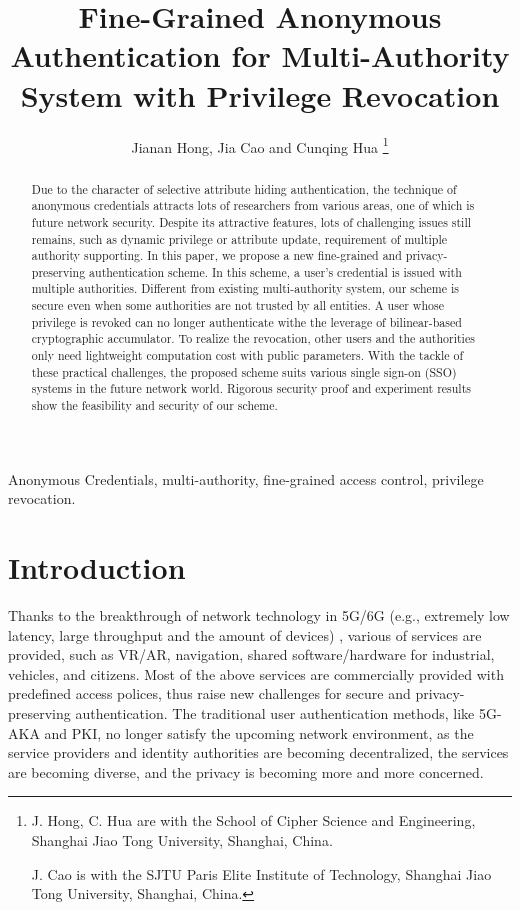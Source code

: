 \documentclass[journal]{IEEEtran}
\title{Fine-Grained Anonymous Authentication for Multi-Authority System with Privilege Revocation}
\author{Jianan Hong, Jia Cao and Cunqing Hua
\thanks{J. Hong, C. Hua are with the School of Cipher Science and Engineering, Shanghai Jiao Tong University, Shanghai, China.

J. Cao is with the SJTU Paris Elite Institute of Technology, Shanghai Jiao Tong University, Shanghai, China.
}
}
\begin{document}
	\maketitle
	
	\begin{abstract}
		Due to the character of selective attribute hiding authentication, the technique of anonymous credentials attracts lots of researchers from various areas, one of which is future network security. Despite its attractive features, lots of challenging issues still remains, such as dynamic privilege or attribute update, requirement of multiple authority supporting. 
		In this paper, we propose a new fine-grained and privacy-preserving authentication scheme. In this scheme, a user's credential is issued with multiple authorities. Different from existing multi-authority system, our scheme is secure even when some authorities are not trusted by all entities. A user whose privilege is revoked can no longer authenticate withe the leverage of bilinear-based cryptographic accumulator. To realize the revocation, other users and the authorities only need lightweight computation cost with public parameters. With the tackle of these practical challenges, the proposed scheme suits various single sign-on (SSO) systems in the future network world. Rigorous security proof and experiment results show the feasibility and security of our scheme.
	\end{abstract}
\begin{IEEEkeywords}
	Anonymous Credentials, multi-authority, fine-grained access control, privilege revocation.
\end{IEEEkeywords}


\section{Introduction}
Thanks to the breakthrough of network technology in 5G/6G (e.g., extremely low latency, large throughput and the amount of devices) \cite{siriwardhana2021survey, jiang2021road}, various of services are provided, such as VR/AR, navigation, shared software/hardware for industrial, vehicles, and citizens. Most of the above services are commercially provided with predefined access polices, thus raise new challenges for secure and privacy-preserving authentication. The traditional user authentication methods, like 5G-AKA and PKI, no longer satisfy the upcoming network environment, as the service providers and identity authorities are becoming decentralized, the services are becoming diverse, and the privacy is becoming more and more concerned. 
\end{document}
